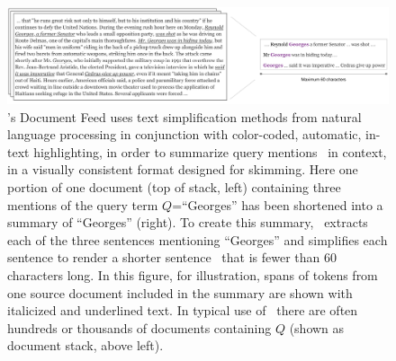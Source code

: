 
\begin{figure}[ht]
\centering
\includegraphics[width=.8\textwidth]{figures/Compression.pdf}
\caption[Text simplification in \ours's Document Feed]{\ours's Document Feed uses text simplification methods from natural language processing in conjunction with color-coded, automatic, in-text highlighting, in order to summarize query mentions \mentions~in context, in a visually consistent format designed for skimming. 
Here one portion of one document (top of stack, left) containing three mentions of the query term $Q$=``Georges'' has been shortened into a summary of ``Georges'' (right). 
To create this summary, \ours~extracts each of the three sentences mentioning ``Georges'' and simplifies each sentence to render a shorter sentence \simplifiedsentence~that is fewer than 60 characters long. 
In this figure, for illustration, spans of tokens from one source document included in the summary are shown with italicized and underlined text. 
In typical use of \ours~there are often hundreds or thousands of documents containing $Q$ (shown as document stack, above left).}\label{f:compressioncartoon}
\end{figure}
